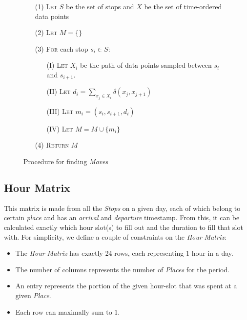 \begin{figure}[h]
    \centering
    \begin{center}
    \begin{itemize}
    \item[(1)] \textsc{Let} $S$ be the set of stops and $X$ be the set of time-ordered data points
    \item[(2)] \textsc{Let} $M = \{ \}$
    \item[(3)] \textsc{For} each stop $s_i \in S$:
    \begin{itemize}
        \item[(I)] \textsc{Let} $X_i$ be the path of data points sampled between $s_i$ and $s_{i+1}$.
        \item[(II)] \textsc{Let} $d_i = \sum_{x_j \in X_i} \delta(x_j, x_{j+1})$ 
        \item[(III)] \textsc{Let} $m_i = (s_i, s_{i+1}, d_i)$ 
        \item[(IV)] \textsc{Let} $M = M \cup \{m_i\}$ 
    \end{itemize}
    \item[(4)] \textsc{Return} $M$
\end{itemize} 
\end{center}
    \caption{Procedure for finding \textit{Moves}}
    \label{fig:find_moves}
\end{figure}

\subsection{Hour Matrix}
This matrix is made from all the \textit{Stops} on a given day, each of which belong to certain \textit{place} and has an \textit{arrival} and \textit{departure} timestamp. From this, it can be calculated exactly which hour slot(s) to fill out and the duration to fill that slot with. For simplicity, we define a couple of constraints on the \textit{Hour Matrix}:

\begin{itemize}
    \item The \textit{Hour Matrix} has exactly 24 rows, each representing 1 hour in a day.
    \item The number of columns represents the number of \textit{Places} for the period. 
    \item An entry represents the portion of the given hour-slot that was spent at a given \textit{Place}.
    \item Each row can maximally sum to 1.
\end{itemize}

